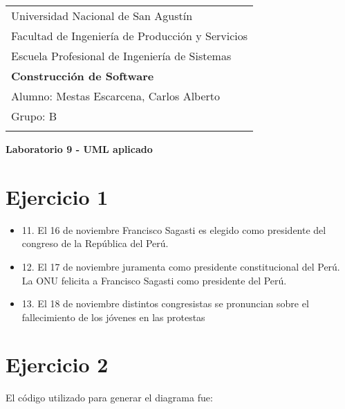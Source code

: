 \documentclass[a4paper,12pt]{article}
\begin{document}
\thispagestyle{empty}

\begin{tabular}{p{15.5cm}} 
\large Universidad Nacional de San Agustín \\ 
\large Facultad de Ingeniería de Producción y Servicios \\
\large Escuela Profesional de Ingeniería de Sistemas \\
{\LARGE \bf Construcción de Software} \\
\vspace{1mm}
Alumno: Mestas Escarcena, Carlos Alberto \\
Grupo: B \\
\hline \\
\end{tabular} 

\begin{center} 
	{\LARGE \bf Laboratorio 9 - UML aplicado}
	\vspace{2mm}
\end{center}  

\section*{Ejercicio 1}

\begin{itemize}
    \item 11. El 16 de noviembre Francisco Sagasti es elegido como presidente del congreso de la República del Perú.
    \item 12. El 17 de noviembre juramenta como presidente constitucional del Perú. La ONU felicita a Francisco Sagasti como presidente del Perú.
    \item 13. El 18 de noviembre distintos congresistas se pronuncian sobre el fallecimiento de los jóvenes en las protestas
\end{itemize}

\section*{Ejercicio 2}



\clearpage
\newpage

El código utilizado para generar el diagrama fue:
\end{document}
